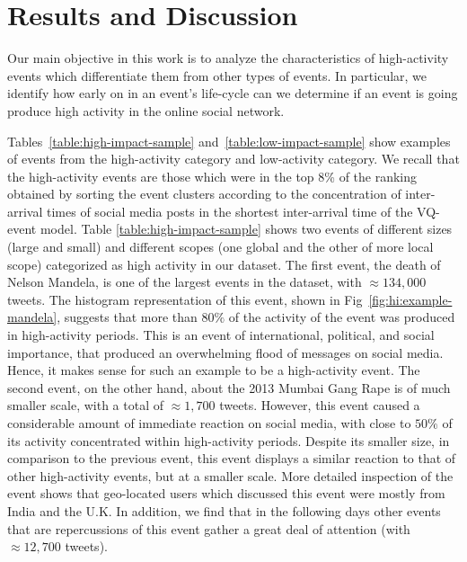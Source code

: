 \section{Results and Discussion}

Our main objective in this work is to analyze the characteristics of
high-activity events which differentiate them from other types of events. 
%
In particular, we identify how early on in an event's life-cycle can we determine
if an event is going produce high activity in the online social network.




Tables~\ref{table:high-impact-sample} and~\ref{table:low-impact-sample} show
examples of events from the high-activity category and low-activity category. 
%
We recall that the high-activity events are those which were in the top 8\% of
the ranking obtained by sorting the event clusters according to the concentration of
inter-arrival times of social media posts in the shortest inter-arrival time of
the VQ-event model.  
%
Table \ref{table:high-impact-sample} shows two events of different sizes (large
and small) and different scopes (one global and the other of more local scope)
categorized as high activity in our dataset. 
%
The first event, the death of Nelson Mandela, is one of the largest events in
the dataset, with $\approx 134,000$ tweets. 
%
The histogram representation of this event, shown in
Fig~\ref{fig:hi:example-mandela}, suggests that more than $80\%$ of the activity
of the event was produced in high-activity periods.
%
This is an event of international, political, and social importance, that
produced an overwhelming flood of messages on social media. %
%
Hence, it makes sense for such an example to be a high-activity event. 
%
The second event, on the other hand, about the 2013 Mumbai Gang Rape is of much
smaller scale, with a total of $\approx 1,700$ tweets. 
%
However, this event caused a considerable amount of immediate reaction on social
media, with close to $50\%$ of its activity concentrated within high-activity
periods. 
%
Despite its smaller size, in comparison to the previous event, this event
displays a similar reaction to that of other high-activity events, but at a
smaller scale. 
%
More detailed inspection of the event shows that geo-located users which
discussed this event were mostly from India and the U.K. 
%
In addition, we find that in the following days other events that are
repercussions of this event gather a great deal of attention (with $\approx
12,700$ tweets).


